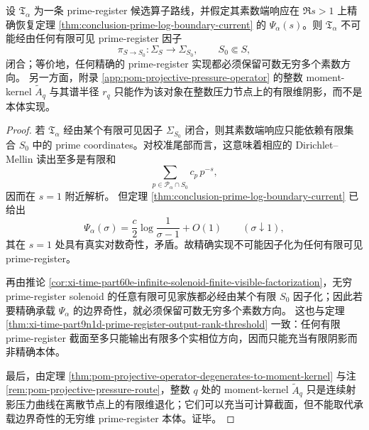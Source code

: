 \begin{theorem}\label{thm:conclusion-prime-log-infinite-rank-register}
设 \(\mathfrak T_\alpha\) 为一条 prime-register 候选算子路线，并假定其素数端响应在 \(\Re s>1\) 上精确恢复定理 \ref{thm:conclusion-prime-log-boundary-current} 的 \(\Psi_\alpha(s)\)。则 \(\mathfrak T_\alpha\) 不可能经由任何有限可见 prime-register 因子
\[
\pi_{S\to S_0}:\Sigma_S\to \Sigma_{S_0},
\qquad S_0\Subset S,
\]
闭合；等价地，任何精确的 prime-register 实现都必须保留可数无穷多个素数方向。
另一方面，附录 \ref{app:pom-projective-pressure-operator} 的整数 moment-kernel \(\widetilde A_q\) 与其谱半径 \(r_q\) 只能作为该对象在整数压力节点上的有限维阴影，而不是本体实现。
\end{theorem}
\begin{proof}
若 \(\mathfrak T_\alpha\) 经由某个有限可见因子 \(\Sigma_{S_0}\) 闭合，则其素数端响应只能依赖有限集合 \(S_0\) 中的 prime coordinates。对校准尾部而言，这意味着相应的 Dirichlet--Mellin 读出至多是有限和
\[
\sum_{p\in \mathcal P_\alpha\cap S_0} c_p\,p^{-s},
\]
因而在 \(s=1\) 附近解析。
但定理 \ref{thm:conclusion-prime-log-boundary-current} 已给出
\[
\Psi_\alpha(\sigma)=\frac{c}{2}\log\frac{1}{\sigma-1}+O(1)
\qquad (\sigma\downarrow 1),
\]
其在 \(s=1\) 处具有真实对数奇性，矛盾。故精确实现不可能因子化为任何有限可见 prime-register。

再由推论 \ref{cor:xi-time-part60e-infinite-solenoid-finite-visible-factorization}，无穷 prime-register solenoid 的任意有限可见家族都必经由某个有限 \(S_0\) 因子化；因此若要精确承载 \(\Psi_\alpha\) 的边界奇性，就必须保留可数无穷多个素数方向。
这也与定理 \ref{thm:xi-time-part9n1d-prime-register-output-rank-threshold} 一致：任何有限 prime-register 截面至多只能输出有限多个实相位方向，因而只能充当有限阴影而非精确本体。

最后，由定理 \ref{thm:pom-projective-operator-degenerates-to-moment-kernel} 与注 \ref{rem:pom-projective-pressure-route}，整数 \(q\) 处的 moment-kernel \(\widetilde A_q\) 只是连续射影压力曲线在离散节点上的有限维退化；它们可以充当可计算截面，但不能取代承载边界奇性的无穷维 prime-register 本体。证毕。
\end{proof}


